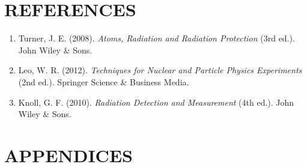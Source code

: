 \documentclass[a4paper,11pt]{article}
\begin{document}
\section*{\center REFERENCES}
\label{sec:REFERENCES}
\begin{enumerate}
    \item Turner, J. E. (2008). \textit{Atoms, Radiation and Radiation Protection} (3rd ed.). John Wiley \& Sons.
    \item Leo, W. R. (2012). \textit{Techniques for Nuclear and Particle Physics Experiments} (2nd ed.). Springer Science \& Business Media.
    \item Knoll, G. F. (2010). \textit{Radiation Detection and Measurement} (4th ed.). John Wiley \& Sons.
\end{enumerate}

\newpage
{}
\section*{\center APPENDICES}
\label{sec:APPENDICES}
\end{document}
